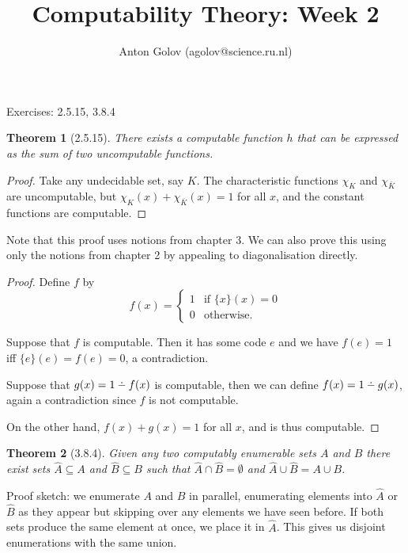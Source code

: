 \documentclass{article}
\title{Computability Theory: Week 2}
\author{Anton Golov (agolov@science.ru.nl)}
\newtheorem{theorem}{Theorem}
\def\dotminus{\mathbin{\ooalign{\hss\raise1ex\hbox{.}\hss\cr
  \mathsurround=0pt$-$}}}
\begin{document}
  \maketitle

  Exercises: 2.5.15, 3.8.4

  \begin{theorem}[2.5.15]
    There exists a computable function $h$ that can be expressed as the sum of
    two uncomputable functions.
  \end{theorem}

  \begin{proof}
    Take any undecidable set, say $K$.  The characteristic functions $\chi_K$ and $\chi_{\bar K}$
    are uncomputable, but $\chi_K(x) + \chi_{\bar K}(x) = 1$ for all $x$, and the constant functions
    are computable.
  \end{proof}

  Note that this proof uses notions from chapter 3.  We can also prove this using only the notions
  from chapter 2 by appealing to diagonalisation directly.

  \begin{proof}
    Define $f$ by
    \[
      f(x) =
      \begin{cases}
        1 & \text{if $\{x\}(x) = 0$}\\
        0 & \text{otherwise.}
      \end{cases}
    \]

    Suppose that $f$ is computable.  Then it has some code $e$ and we have $f(e) = 1$
    iff $\{e\}(e) = f(e) = 0$, a contradiction.

    Suppose that $g(x) = 1 \dotminus f(x)$ is computable, then we can define $f(x) = 1 \dotminus g(x)$,
    again a contradiction since $f$ is not computable.

    On the other hand, $f(x) + g(x) = 1$ for all $x$, and is thus computable.
  \end{proof}

  \begin{theorem}[3.8.4]
    Given any two computably enumerable sets $A$ and $B$ there exist sets $\hat A \subseteq A$
    and $\hat B \subseteq B$ such that $\hat A \cap \hat B = \emptyset$ and $\hat A \cup \hat B =
    A \cup B$.
  \end{theorem}

  Proof sketch: we enumerate $A$ and $B$ in parallel, enumerating elements into $\hat A$ or $\hat B$
  as they appear but skipping over any elements we have seen before.  If both sets produce the same
  element at once, we place it in $\hat A$.  This gives us disjoint enumerations with the same union.
\end{document}
